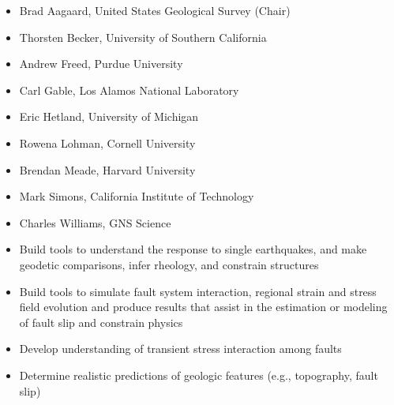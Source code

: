 \documentclass[pdftex,cig,slideColor]{pp4slides}
\begin{document}
  \begin{itemize}
  \item Brad Aagaard, United States Geological Survey (Chair)
  \item Thorsten Becker, University of Southern California
  \item Andrew Freed, Purdue University
  \item Carl Gable, Los Alamos National Laboratory
  \item Eric Hetland, University of Michigan
  \item Rowena Lohman, Cornell University
  \item Brendan Meade, Harvard University
  \item Mark Simons, California Institute of Technology
  \item Charles Williams, GNS Science
 \end{itemize}

  \summary{}
 
  \begin{itemize}
  \item Build tools to understand the response to single earthquakes,
    and make geodetic comparisons, infer rheology, and constrain
    structures
  \item Build tools to simulate fault system interaction, regional
    strain and stress field evolution and produce results that assist
    in the estimation or modeling of fault slip and constrain physics
  \item Develop understanding of transient stress interaction among
    faults
  \item Determine realistic predictions of geologic features (e.g.,
    topography, fault slip)
  \end{itemize}
  
 
\end{document}

